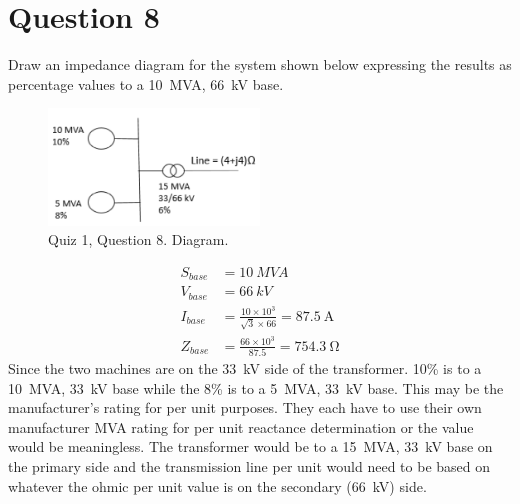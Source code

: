 \section{Question 8}
Draw an impedance diagram for the system shown below expressing the results as percentage values to a \SI{10}{MVA}, \SI{66}{kV} base.
\begin{figure}[H]
    \centering
    \includegraphics[width = 0.5\textwidth]{img/figure148.png}
    \caption{Quiz 1, Question 8. Diagram.}
\end{figure}
\begin{align}
    S_{base} & = \SI{10}{MVA}                                                 \\
    V_{base} & = \SI{66}{kV}                                                  \\
    I_{base} & = \frac{10\times 10^3}{\sqrt{3}\times 66} = \SI{87.5}{\ampere} \\
    Z_{base} & = \frac{66\times 10^3}{87.5} = \SI{754.3}{\ohm}
\end{align}
Since the two machines are on the \SI{33}{kV} side of the transformer. 10\% is to a \SI{10}{MVA}, \SI{33}{kV} base while the 8\% is to a \SI{5}{MVA}, \SI{33}{kV} base. This may be the manufacturer's rating for per unit purposes. They each have to use their own manufacturer MVA rating for per unit reactance determination or the value would be meaningless. The transformer would be to a \SI{15}{MVA}, \SI{33}{kV} base on the primary side and the transmission line per unit would need to be based on whatever the ohmic per unit value is on the secondary (\SI{66}{kV}) side.

